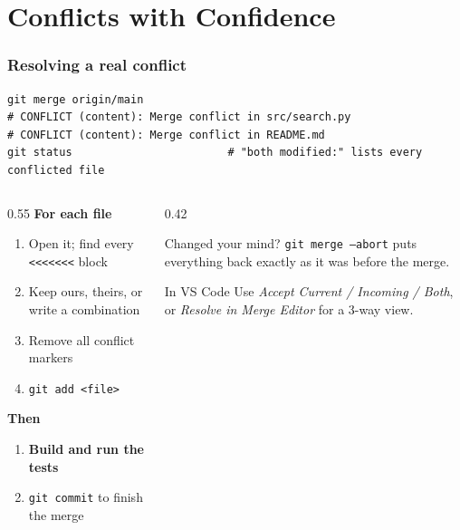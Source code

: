 \documentclass[aspectratio=169,10pt,compress]{beamer}
\newcommand{\cmd}[1]{\texttt{\color{gitred}#1}}
\begin{document}
\section[Conflicts]{Conflicts with Confidence}

\begin{frame}[t,fragile] \frametitle{Resolving a real conflict}
\begin{lstlisting}
git merge origin/main
# CONFLICT (content): Merge conflict in src/search.py
# CONFLICT (content): Merge conflict in README.md
git status                        # "both modified:" lists every conflicted file
\end{lstlisting}

  \begin{columns}[T]
    \begin{column}{0.55\textwidth}
      \textbf{For each file}
      \begin{enumerate}\small
        \item Open it; find every \texttt{<{}<{}<{}<{}<{}<{}<} block
        \item Keep ours, theirs, or write a combination
        \item Remove all conflict markers
        \item \cmd{git add <file>}
      \end{enumerate}
      \textbf{Then}
      \begin{enumerate}\small\setcounter{enumi}{4}
        \item \textbf{Build and run the tests}
        \item \cmd{git commit} to finish the merge
      \end{enumerate}
    \end{column}
    \begin{column}{0.42\textwidth}
      \begin{block}{Changed your mind?}
        \cmd{git merge --abort} puts everything back exactly as it was before the merge.
      \end{block}
      \begin{block}{In VS Code}
        \small Use \emph{Accept Current / Incoming / Both}, or
        \emph{Resolve in Merge Editor} for a 3-way view.
      \end{block}
    \end{column}
  \end{columns}
\end{frame}
\end{document}
